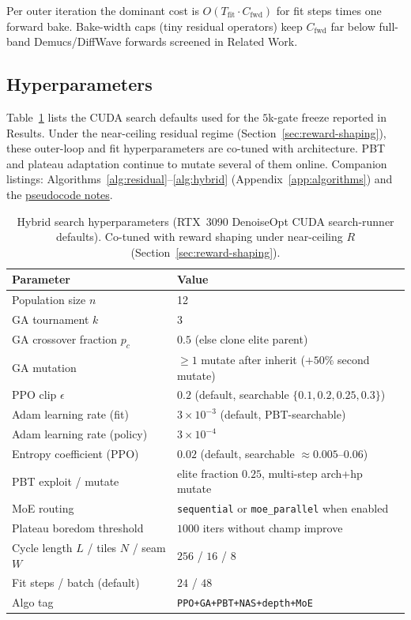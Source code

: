 \begin{remark}
\label{rem:complexity}
Per outer iteration the dominant cost is $O(T_{\mathrm{fit}}\cdot C_{\mathrm{fwd}})$ for fit steps times one forward bake.
Bake-width caps (tiny residual operators) keep $C_{\mathrm{fwd}}$ far below full-band Demucs/DiffWave forwards screened in Related Work.
\end{remark}

\subsection{Hyperparameters}
\label{sec:hyperparams}

Table~\ref{tab:hyperparams} lists the CUDA search defaults used for the $5$k-gate freeze reported in Results.
Under the near-ceiling residual regime (Section~\ref{sec:reward-shaping}), these outer-loop and fit hyperparameters are co-tuned with architecture. PBT and plateau adaptation continue to mutate several of them online.
Companion listings: Algorithms~\ref{alg:residual}--\ref{alg:hybrid} (Appendix~\ref{app:algorithms}) and the \href{https://github.com/reeldemo/denoise-opt-meta/blob/master/docs/PSEUDOCODE.md}{pseudocode notes}.

\begin{table}[t]
  \centering
  \small
  \caption{Hybrid search hyperparameters (RTX~3090 DenoiseOpt CUDA search-runner defaults). Co-tuned with reward shaping under near-ceiling $R$ (Section~\ref{sec:reward-shaping}).}
  \label{tab:hyperparams}
  \setlength{\tabcolsep}{3pt}
  \begin{tabular}{@{}lp{}@{}}
    \toprule
    Parameter & Value \\
    \midrule
    Population size $n$ & 12 \\
    GA tournament $k$ & 3 \\
    GA crossover fraction $p_c$ & $0.5$ (else clone elite parent) \\
    GA mutation & $\ge 1$ mutate after inherit ($+50\%$ second mutate) \\
    PPO clip $\epsilon$ & $0.2$ (default, searchable $\{0.1,0.2,0.25,0.3\}$) \\
    Adam learning rate (fit) & $3{\times}10^{-3}$ (default, PBT-searchable) \\
    Adam learning rate (policy) & $3{\times}10^{-4}$ \\
    Entropy coefficient (PPO) & $0.02$ (default, searchable $\approx 0.005$--$0.06$) \\
    PBT exploit / mutate & elite fraction $0.25$, multi-step arch+hp mutate \\
    MoE routing & \texttt{sequential} or \texttt{moe\_parallel} when enabled \\
    Plateau boredom threshold & $1000$ iters without champ improve \\
    Cycle length $L$ / tiles $N$ / seam $W$ & $256$ / $16$ / $8$ \\
    Fit steps / batch (default) & $24$ / $48$ \\
    Algo tag & \texttt{PPO+GA+PBT+NAS+depth+MoE} \\
    \bottomrule
  \end{tabular}
\end{table}
